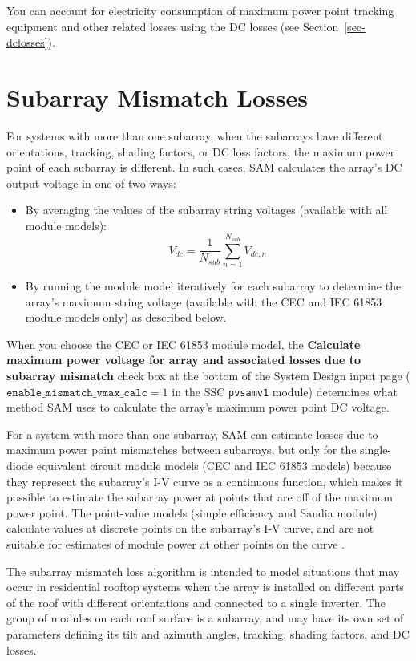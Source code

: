 \documentclass[12pt,letterpaper]{article}
\begin{document}
You can account for electricity consumption of maximum power point tracking equipment and other related losses using the DC losses (see Section~\ref{sec-dclosses}).

\section{Subarray Mismatch Losses}\label{sec-subarraymismatch}
For systems with more than one subarray, when the subarrays have different orientations, tracking, shading factors, or DC loss factors, the maximum power point of each subarray is different. In such cases, SAM calculates the array's DC output voltage in one of two ways:
\begin{itemize}
\item By averaging the values of the subarray string voltages (available with all module models): 
\begin{equation}
V_{dc} =  \frac{1}{N_{sub}}\sum_{n=1}^{N_{sub}} V_{dc,n}
\end{equation}
\item By running the module model iteratively for each subarray to determine the array's maximum string voltage (available with the CEC and IEC 61853 module models only) as described below.
\end{itemize}

When you choose the CEC or IEC 61853 module model, the \textbf{Calculate maximum power voltage for array and associated losses due to subarray mismatch} check box at the bottom of the System Design input page ($\mathtt{enable\_mismatch\_vmax\_calc}=1$ in the SSC \texttt{pvsamv1} module) determines what method SAM uses to calculate the array's maximum power point DC voltage.

For a system with more than one subarray, SAM can estimate losses due to maximum power point mismatches between subarrays, but only for the single-diode equivalent circuit module models (CEC and IEC 61853 models) because they represent the subarray's I-V curve as a continuous function, which makes it possible to estimate the subarray power at points that are off of the maximum power point. The point-value models (simple efficiency and Sandia module) calculate values at discrete points on the subarray's I-V curve, and are not suitable for estimates of module power at other points on the curve \citep{dobos2012b}.

The subarray mismatch loss algorithm \citep{dobos2012b} is intended to model situations that may occur in residential rooftop systems when the array is installed on different parts of the roof with different orientations and connected to a single inverter. The group of modules on each roof surface is a subarray, and may have its own set of parameters defining its tilt and azimuth angles, tracking, shading factors, and DC losses. 
\end{document}
